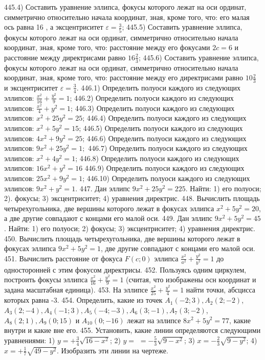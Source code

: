 445.4) Составить уравнение эллипса, фокусы которого лежат на оси ординат, симметрично относительно начала координат, зная, кроме того, что: его малая ось равна 16 , а эксцентриситет $\varepsilon=\frac{3}{5}$;
445.5) Составить уравнение эллипса, фокусы которого лежат на оси ординат, симметрично относительно начала координат, зная, кроме того, что: расстояние между его фокусами $2 c=6$ и расстояние между директрисами равно $16 \frac{2}{3}$;
445.6) Составить уравнение эллипса, фокусы которого лежат на оси ординат, симметрично относительно начала координат, зная, кроме того, что: расстояние между его директрисами равно $10 \frac{2}{3}$ и эксцентриситет $\varepsilon=\frac{3}{4}$.
446.1) Определить полуоси каждого из следующих эллипсов: $\frac{x^2}{16}+\frac{y^2}{9}=1$;
446.2) Определить полуоси каждого из следующих эллипсов: $\frac{x^2}{4}+y^2=1$;
446.3) Определить полуоси каждого из следующих эллипсов: $x^2+25 y^2=25$;
446.4) Определить полуоси каждого из следующих эллипсов: $x^2+5 y^2=15$;
446.5) Определить полуоси каждого из следующих эллипсов: $4 x^2+9 y^2=25$;
446.6) Определить полуоси каждого из следующих эллипсов: $9 x^2+25 y^2=1 ;$
446.7) Определить полуоси каждого из следующих эллипсов: $x^2+4 y^2=1$;
446.8) Определить полуоси каждого из следующих эллипсов: $16 x^2+y^2=16$
446.9) Определить полуоси каждого из следующих эллипсов: $25 x^2+9 y^2=1$;
446.10) Определить полуоси каждого из следующих эллипсов: $9 x^2+y^2=1$.
447. Дан эллипс $9 x^2+25 y^2=225$. Найти: 1) его полуоси; 2). фокусы; 3) эксцентриситет; 4) уравнения директрис.
448. Вычислить площадь четырехугольника, две вершины которого лежат в фокусах эллипса $x^2+5 y^2=20$, а две другие совпадают с концами его малой оси.
449. Дан эллипс $9 x^2+5 y^2=45$. Найти: 1) его полуоси; 2) фокусы; 3) эксцентриситет; 4) уравнения директрис.
450. Вычислить площадь четырехугольника, две вершины которого лежат в фокусах эллипса $9 x^2+5 y^2=1$, две другие совпадают с концами его малой оси.
451. Вычислить расстояние от фокуса $F(c ; 0)$ эллипса $\frac{x^2}{a^2}+\frac{y^2}{b^2}=1$ до односторонней с этим фокусом директрисы.
452. Пользуясь одним циркулем, построить фокусы эллипса $\frac{x^2}{16}+\frac{y^2}{9}=1$ (считая, что изображены осн координат и задана масштабная единица).
453. На эллипсе $\frac{x^2}{25}+\frac{y^2}{4}=1$ найти точки, абсцисса которых равна -3.
454. Определить, какие из точек $A_1(-2 ; 3), A_2(2 ;-2)$, $A_3(2 ;-4), A_4(-1 ; 3), A_5(-4 ;-3), A_6(3 ;-1), A_7(3 ;-2)$, $A_8(2 ; 1), A_9(0 ; 15)$ и $A_{10}(0 ;-16)$ лежат на эллипсе $8 x^2+5 y^2=77$, какие внутри и какие вне его.
455. Установить, какие линии определяются следующими уравнениями: 1) $y=+\frac{3}{4} \sqrt{16-x^2}$; 2) $y=$ $=-\frac{5}{3} \sqrt{9-x^2}$; 3) $x=-\frac{2}{3} \sqrt{9-y^2}$; 4) $x=+\frac{1}{7} \sqrt{49-y^2}$. Изобразить эти линии на чертеже.
